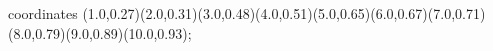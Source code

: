 					coordinates { (1.0,0.27)(2.0,0.31)(3.0,0.48)(4.0,0.51)(5.0,0.65)(6.0,0.67)(7.0,0.71)(8.0,0.79)(9.0,0.89)(10.0,0.93)};